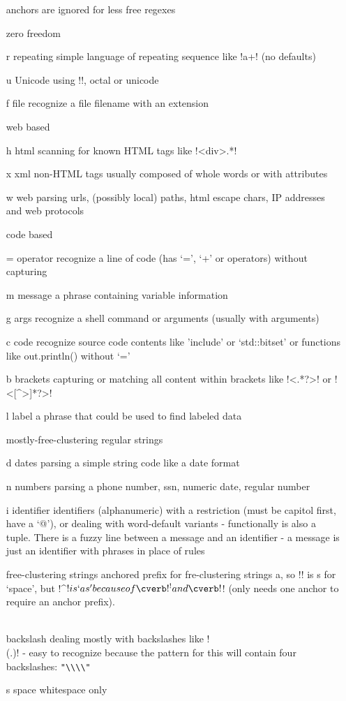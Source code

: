 \begin{itemize}
anchors are ignored for less free regexes

zero freedom
\item[ r ] repeating        simple language of repeating sequence like \cverb!a+! (no defaults)
\item[ u ] Unicode          using \cverb!\x[a-f0-9][a-f0-9]!, octal or unicode
\item[ f ] file             recognize a file filename with an extension

web based
\item[ h ] html      scanning for known HTML tags like \cverb!<div>.*!
\item[ x ] xml       non-HTML tags usually composed of whole words or with attributes
\item[ w ] web       parsing urls, (possibly local) paths, html escape chars, IP addresses and web protocols

code based
\item[ = ] operator     recognize a line of code (has `=', `+' or operators) without capturing
\item[ m ] message      a phrase containing variable information
\item[ g ] args         recognize a shell command or arguments (usually with arguments)
\item[ c ] code         recognize source code contents like 'include' or `std::bitset' or functions like out.println() without `='
\item[ b ] brackets  capturing or matching all content within brackets like \cverb!<.*?>! or \cverb!<[^>]*?>!
\item[ l ] label        a phrase that could be used to find labeled data

mostly-free-clustering regular strings

\item[ d ] dates         parsing a simple string code like a date format
\item[ n ] numbers       parsing a phone number, ssn, numeric date, regular number
\item[ i ] identifier    identifiers (alphanumeric) with a restriction (must be capitol first, have a `@'), or dealing with word-default variants - functionally is also a tuple.  There is a fuzzy line between a message and an identifier - a message is just an identifier with phrases in place of rules

free-clustering strings
anchored prefix for fre-clustering strings a, so \cverb!\s*! is s for `space', but \cverb!^\s*$! is `as' because of \cverb!^! and \cverb!$! (only needs one anchor to require an anchor prefix).
\item[ \\ ] backslash    dealing mostly with backslashes like \cverb!\\(.)! - easy to recognize because the pattern for this will contain four backslashes: \verb!"\\\\"!
\item[ s ] space         whitespace only


\end{itemize}
